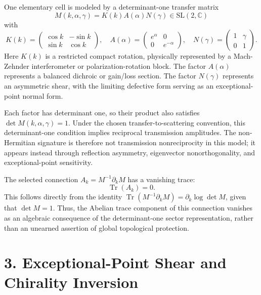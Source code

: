 \documentclass[aps,prl,twocolumn,superscriptaddress,amsmath,amssymb]{revtex4-2}
\begin{document}
One elementary cell is modeled by a determinant-one transfer matrix
\begin{equation}
M(k,\alpha,\gamma)=K(k)A(\alpha)N(\gamma)\in \mathrm{SL}(2,\mathbb{C})
\end{equation}
with
\begin{equation}
K(k)=
\begin{pmatrix}
\cos k & -\sin k\\
\sin k & \cos k
\end{pmatrix},
\quad
A(\alpha)=
\begin{pmatrix}
e^\alpha & 0\\
0 & e^{-\alpha}
\end{pmatrix},
\quad
N(\gamma)=
\begin{pmatrix}
1 & \gamma\\
0 & 1
\end{pmatrix}.
\end{equation}
Here $K(k)$ is a restricted compact rotation, physically represented by a Mach-Zehnder interferometer or polarization-rotation block. The factor $A(\alpha)$ represents a balanced dichroic or gain/loss section. The factor $N(\gamma)$ represents an asymmetric shear, with the limiting defective form serving as an exceptional-point normal form.

Each factor has determinant one, so their product also satisfies $\det M(k,\alpha,\gamma)=1$. Under the chosen transfer-to-scattering convention, this determinant-one condition implies reciprocal transmission amplitudes. The non-Hermitian signature is therefore not transmission nonreciprocity in this model; it appears instead through reflection asymmetry, eigenvector nonorthogonality, and exceptional-point sensitivity.

The selected connection $A_k=M^{-1}\partial_kM$ has a vanishing trace:
\begin{equation}
\operatorname{Tr}(A_k)=0.
\end{equation}
This follows directly from the identity $\operatorname{Tr}(M^{-1}\partial_kM)=\partial_k\log\det M$, given that $\det M=1$. Thus, the Abelian trace component of this connection vanishes as an algebraic consequence of the determinant-one sector representation, rather than an unearned assertion of global topological protection.

\section{3. Exceptional-Point Shear and Chirality Inversion}
\end{document}
